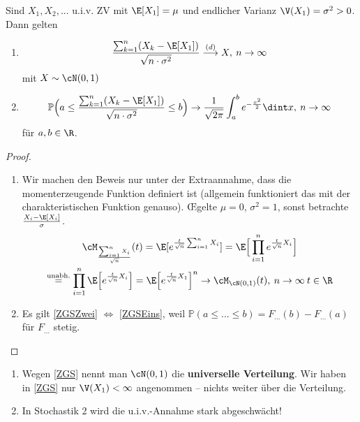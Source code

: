\begin{satz}\label{ZGS}
	Sind $X_1,X_2,...$ u.i.v. ZV mit $\E[X_1] = \mu$ und endlicher Varianz $\V(X_1) = \sigma^2 > 0$. Dann gelten
	\begin{enumerate}[label=(\roman*)]
		\item\label{ZGSEins} \[ \frac{\sum_{k = 1}^{n} (X_k - \E[X_1])}{\sqrt{n \cdot \sigma^2}} \overset{(d)}{\longrightarrow} X, \: n \to \infty \]
		mit $X \sim \cN(0,1)$
		\item\label{ZGSZwei} \[ \mathbb{P}\Big( a \leq \frac{\sum_{k=1}^{n}(X_k - \E[X_1])}{\sqrt{n \cdot \sigma^2}} \leq b \Big) \to \frac{1}{\sqrt{2 \pi}} \int_{a}^{b} e^{-\frac{x^2}{2}} \dint x, \: n \to \infty \]
		für $a,b \in \R$.
	\end{enumerate}
\end{satz}

\begin{proof}\abs
	\begin{enumerate}[label=(\roman*)]
		\item Wir machen den Beweis nur unter der Extraannahme, dass die momenterzeugende Funktion definiert ist (allgemein funktioniert das mit der charakteristischen Funktion genauso). \OE \space gelte $\mu = 0$, $\sigma^2 = 1$, sonst betrachte $\frac{X_i - \E[X_i]}{\sigma}$.
		\begin{gather*}
			\cM_{\frac{\sum_{i=1}^{n} X_i}{\sqrt{n}}}(t) = \E[e^{\frac{t}{\sqrt{n}}\sum_{i=1}^{n} X_i}] = \E\Big[\prod_{i=1}^{n} e^{\frac{t}{\sqrt{n}}X_i}\Big]\\ 
			\overset{\text{unabh.}}{=} \prod_{i=1}^{n} \E\Big[e^{\frac{t}{\sqrt{n}}X_i}\Big] = \E\Big[e^{\frac{t}{\sqrt{n}}X_1}\Big]^n \to \cM_{\cN(0,1)}(t), \: n \to \infty \: t \in \R
		\end{gather*}
		\item Es gilt \ref{ZGSZwei} $\Leftrightarrow$ \ref{ZGSEins}, weil $\mathbb{P}(a \leq ... \leq b) = F_{...}(b) - F_{...}(a)$ für $F_{...}$ stetig.
	\end{enumerate}
\end{proof}

\begin{bem1}\abs
	\begin{enumerate}[label=(\roman*)]
		\item Wegen \ref{ZGS} nennt man $\cN(0,1)$ die \textbf{universelle Verteilung}. Wir haben in \ref{ZGS} nur $\V(X_1) < \infty$ angenommen -- nichts weiter über die Verteilung.
		\item In Stochastik 2 wird die u.i.v.-Annahme stark abgeschwächt!
	\end{enumerate}
\end{bem1}

